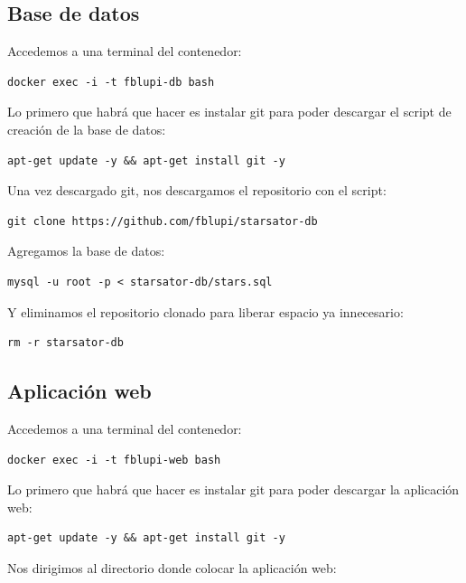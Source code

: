 \subsection{Base de datos}

Accedemos a una terminal del contenedor:

\begin{lstlisting}
docker exec -i -t fblupi-db bash
\end{lstlisting}

Lo primero que habrá que hacer es instalar git para poder descargar el script de creación de la base de datos:

\begin{lstlisting}
apt-get update -y && apt-get install git -y
\end{lstlisting}

Una vez descargado git, nos descargamos el repositorio con el script:

\begin{lstlisting}
git clone https://github.com/fblupi/starsator-db
\end{lstlisting}

Agregamos la base de datos:

\begin{lstlisting}
mysql -u root -p < starsator-db/stars.sql
\end{lstlisting}

Y eliminamos el repositorio clonado para liberar espacio ya innecesario:

\begin{lstlisting}
rm -r starsator-db
\end{lstlisting}

\subsection{Aplicación web}

Accedemos a una terminal del contenedor:

\begin{lstlisting}
docker exec -i -t fblupi-web bash
\end{lstlisting}

Lo primero que habrá que hacer es instalar git para poder descargar la aplicación web:

\begin{lstlisting}
apt-get update -y && apt-get install git -y
\end{lstlisting}

Nos dirigimos al directorio donde colocar la aplicación web:

